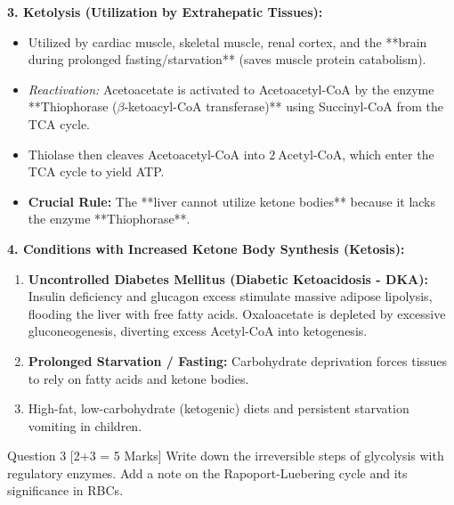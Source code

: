 \documentclass[11pt,a4paper]{article}
\begin{document}
\begin{ansbox}
\textbf{3. Ketolysis (Utilization by Extrahepatic Tissues):}
\begin{itemize}[leftmargin=*]
    \item Utilized by cardiac muscle, skeletal muscle, renal cortex, and the **brain during prolonged fasting/starvation** (saves muscle protein catabolism).
    \item \textit{Reactivation:} Acetoacetate is activated to Acetoacetyl-CoA by the enzyme **Thiophorase ($\beta$-ketoacyl-CoA transferase)** using Succinyl-CoA from the TCA cycle.
    \item Thiolase then cleaves Acetoacetyl-CoA into $2\ \text{Acetyl-CoA}$, which enter the TCA cycle to yield ATP.
    \item \textbf{Crucial Rule:} The **liver cannot utilize ketone bodies** because it lacks the enzyme **Thiophorase**.
\end{itemize}

\textbf{4. Conditions with Increased Ketone Body Synthesis (Ketosis):}
\begin{enumerate}[leftmargin=*]
    \item \textbf{Uncontrolled Diabetes Mellitus (Diabetic Ketoacidosis - DKA):} Insulin deficiency and glucagon excess stimulate massive adipose lipolysis, flooding the liver with free fatty acids. Oxaloacetate is depleted by excessive gluconeogenesis, diverting excess Acetyl-CoA into ketogenesis.
    \item \textbf{Prolonged Starvation / Fasting:} Carbohydrate deprivation forces tissues to rely on fatty acids and ketone bodies.
    \item High-fat, low-carbohydrate (ketogenic) diets and persistent starvation vomiting in children.
\end{enumerate}
\end{ansbox}

\begin{qbox}{Question 3 [2+3 = 5 Marks]}
Write down the irreversible steps of glycolysis with regulatory enzymes. Add a note on the Rapoport-Luebering cycle and its significance in RBCs.
\end{qbox}
\end{document}
